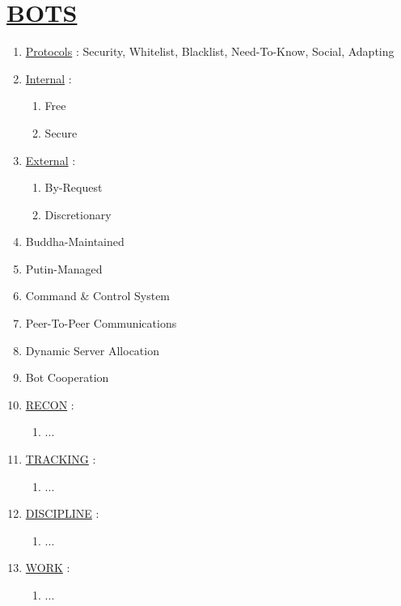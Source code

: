 \documentclass[11pt]{article}
\begin{document}
\section*{\ul{BOTS}}
\begin{enumerate}
	\item[] \ul{Protocols} : Security, Whitelist, Blacklist, Need-To-Know, Social, Adapting

	\item[] \ul{Internal}  :
	\begin{enumerate}
		\item[] Free
		\item[] Secure
	\end{enumerate}
	
	\item[] \ul{External} :
	\begin{enumerate}
		\item[] By-Request
		\item[] Discretionary
	\end{enumerate}

	\item[] Buddha-Maintained
	\item[] Putin-Managed
	\item[] Command \& Control System
	\item[] Peer-To-Peer Communications
	\item[] Dynamic Server Allocation
	\item[] Bot Cooperation

	\item[] \ul{RECON} :
	\begin{enumerate}
	\item[] ...
	\end{enumerate}

	\item[] \ul{TRACKING} :
	\begin{enumerate}
		\item[] ...
	\end{enumerate}

	\item[] \ul{DISCIPLINE} :
	\begin{enumerate}
		\item[] ...
	\end{enumerate}

	\item[] \ul{WORK} :
	\begin{enumerate}
		\item[] ...
	\end{enumerate}


\end{enumerate}
\end{document}
